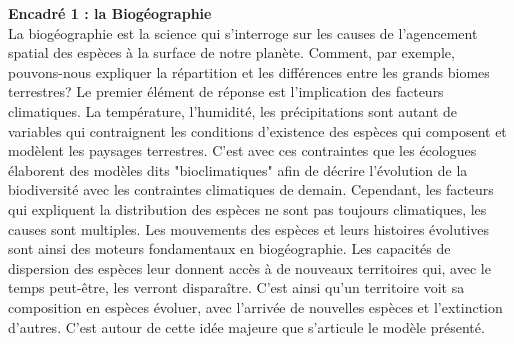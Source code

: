 \newpage

\setlength{\columnsep}{1cm}
\begin{minipage}{0.9\linewidth}
\textbf{Encadré 1 : la Biogéographie} \\
	La biogéographie est la science qui s'interroge sur les causes de l'agencement spatial des espèces à la surface de notre planète. Comment, par exemple, pouvons-nous expliquer la répartition et les différences entre les grands biomes terrestres? Le premier élément de réponse est l'implication des facteurs climatiques. La température, l'humidité, les précipitations sont autant de variables qui contraignent les conditions d'existence des espèces qui composent et modèlent les paysages terrestres. C'est avec ces contraintes que les écologues élaborent des modèles dits "bioclimatiques" afin de décrire l'évolution de la biodiversité avec les contraintes climatiques de demain. Cependant, les facteurs qui expliquent la distribution des espèces ne sont pas toujours climatiques, les causes sont multiples. Les mouvements des espèces et leurs histoires évolutives sont ainsi des moteurs fondamentaux en biogéographie. Les capacités de dispersion des espèces leur donnent accès à de nouveaux territoires qui, avec le temps peut-être, les verront disparaître. C'est ainsi qu'un territoire voit sa composition en espèces évoluer, avec l'arrivée de nouvelles espèces et l'extinction d'autres. C'est autour de cette idée majeure que s'articule le modèle présenté.
\end{minipage}
\vspace{2cm}

